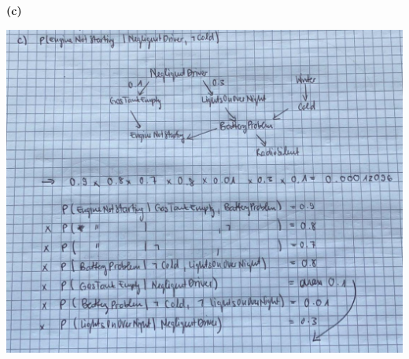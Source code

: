\documentclass[12pt]{article}
\begin{document}
\textbf{(c)}

\includegraphics[width=\textwidth]{figures/8.3c.png}
\end{document}
